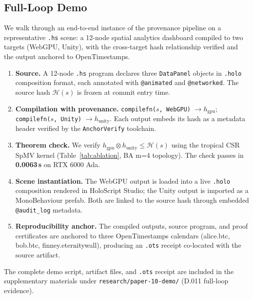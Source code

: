 \documentclass[sigconf,nonacm]{acmart}
\newcommand{\hscore}{\texttt{.hs}}
\newcommand{\holo}{\texttt{.holo}}
\newcommand{\hashfn}{\mathcal{H}}
\newcommand{\tropmult}{\otimes}
\begin{document}
\subsection{Full-Loop Demo}
\label{sec:demo}

We walk through an end-to-end instance of the provenance pipeline on a
representative \hscore{} scene: a 12-node spatial analytics dashboard
compiled to two targets (WebGPU, Unity), with the cross-target hash
relationship verified and the output anchored to OpenTimestamps.

\begin{enumerate}[leftmargin=*,topsep=2pt]
  \item \textbf{Source.}  A 12-node \hscore{} program declares three
    \texttt{DataPanel} objects in \holo{} composition format, each
    annotated with \texttt{@animated} and \texttt{@networked}.
    The source hash $\hashfn(s)$ is frozen at commit entry time.
  \item \textbf{Compilation with provenance.}
    \texttt{compilefn($s$, WebGPU)} $\to h_{\text{gpu}}$;
    \texttt{compilefn($s$, Unity)} $\to h_{\text{unity}}$.
    Each output embeds its hash as a metadata header verified by
    the \texttt{AnchorVerify} toolchain.
  \item \textbf{Theorem check.}  We verify
    $h_{\text{gpu}} \tropmult h_{\text{unity}} \leq \hashfn(s)$
    using the tropical CSR SpMV kernel
    (Table~\ref{tab:ablation}, BA m=4 topology).
    The check passes in \textbf{0.0063\,\textmu{}s} on RTX 6000 Ada.
  \item \textbf{Scene instantiation.}  The WebGPU output is loaded into
    a live \texttt{.holo} composition rendered in HoloScript Studio;
    the Unity output is imported as a MonoBehaviour prefab.  Both
    are linked to the source hash through embedded \texttt{@audit\_log}
    metadata.
  \item \textbf{Reproducibility anchor.}  The compiled outputs, source
    program, and proof certificates are anchored to three OpenTimestamps
    calendars (alice.btc, bob.btc, finney.eternitywall), producing an
    \texttt{.ots} receipt co-located with the source artifact.
\end{enumerate}

The complete demo script, artifact files, and \texttt{.ots} receipt are
included in the supplementary materials under
\texttt{research/paper-10-demo/} (D.011 full-loop evidence).
\end{document}
